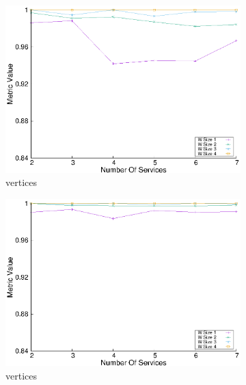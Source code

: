 \begin{figure}[H]
\begin{subfigure}{0.45\textwidth}
    \includegraphics[width=\textwidth]{Images/graphs/window_quality_performance_diff_qual_n7_s7_20_100_n4}
    \caption{ vertices}
    \label{fig:quality_window_wide_qualitative_n4}
  \end{subfigure}
  \hfill
  \begin{subfigure}{0.45\textwidth}
    \includegraphics[width=\textwidth]{Images/graphs/window_quality_performance_diff_qual_n7_s7_50_80_n4}
    \caption{ vertices}
    \label{fig:quality_window_average_qualitative_n4}
  \end{subfigure}
  \hfill
  \begin{subfigure}{0.45\textwidth}

\end{subfigure}
\end{figure}
